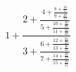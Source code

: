 \documentclass{article}
\begin{document}
\begin{equation}
1+\frac{2+\frac{4+\frac{8+\frac{16}{17}}{9+\frac{18}{19}}}{5+\frac{10+\frac{20}{21}}{11+\frac{22}{23}}}}{3+\frac{6+\frac{12+\frac{24}{25}}{13+\frac{26}{27}}}{7+\frac{14+\frac{28}{29}}{15+\frac{30}{31}}}}
\end{equation}
\end{document}
